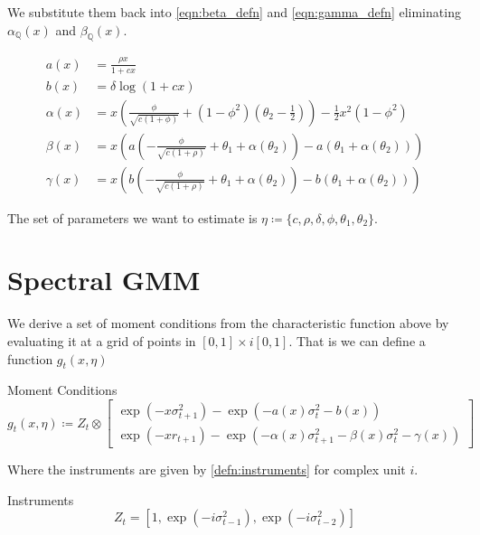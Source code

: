 \documentclass[11pt]{article}
\newcommand*{\Q}{\mathbb{Q}}
\begin{document}
We substitute them back into \cref{eqn:beta_defn} and \cref{eqn:gamma_defn} eliminating $\alpha_{\Q}(x)$ and
$\beta_{\Q}(x)$.

\begin{align}
    a(x) &= \frac{\rho x}{1 + c x} \\ \label{eqn:a(x)}
    b(x) &= \delta \log \left(1 + c x\right) \\ \label{eqn:b(x)}
    \alpha(x) &= x \left(\frac{\phi}{\sqrt{c (1 + \phi)}}  + (1 - \phi^2)\left(\theta_2 - \frac{1}{2}\right)\right)
    - \frac{1}{2} x^2 (1 - \phi^2) \\ \label{eqn:alpha(x)}
    \beta(x)  &= x \left(a\left(-\frac{\phi}{\sqrt{c(1+ \rho)}} + \theta_1 + \alpha(\theta_2)\right) -
        a\left(\theta_1 + \alpha(\theta_2)\right)\right) \\ 
        \label{eqn:beta(x)}
    \gamma(x) &= x \left(b\left(-\frac{\phi}{\sqrt{c(1+\rho)}} + \theta_1 + \alpha(\theta_2)\right) -
        b\left(\theta_1 + \alpha(\theta_2)\right) \right)
\end{align}


The set of parameters we want to estimate is $\eta \coloneqq \lbrace c, \rho, \delta, \phi, \theta_1,
\theta_2\rbrace$.

\section{Spectral GMM}
\label{sec:spectral_GMM}

We derive a set of moment conditions from the characteristic function above by evaluating it at a grid of points
in $[0,1] \times i [0,1]$. 
That is we can define a function $g_t(x, \eta)$

\begin{defn}{Moment Conditions}
    \begin{equation}
        g_t(x, \eta) \coloneqq Z_t \otimes \begin{bmatrix} \exp(- x \sigma^2_{t+1}) - \exp\left( - a(x) \sigma_t^2
        - b(x) \right) \\ \exp\left(- x r_{t+1}\right) - \exp\left(- \alpha(x) \sigma^2_{t+1} - \beta(x)
        \sigma^2_t - \gamma(x)\right) \end{bmatrix}
    \end{equation}
\end{defn}

Where the instruments are given by \cref{defn:instruments} for complex unit $i$. 

\begin{defn}{Instruments}
    \label{defn:instruments}
    \begin{equation}
        Z_t = \left[1, \exp\left(- i \sigma_{t-1}^2\right), \exp\left(-i \sigma^2_{t-2}\right)\right] 
    \end{equation}
\end{defn}
\end{document}
